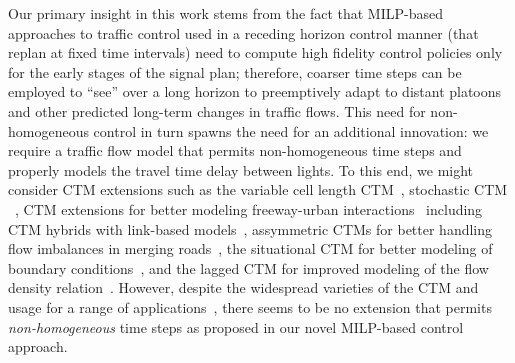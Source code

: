 Our primary insight in this work stems from the fact that MILP-based
approaches to traffic control used in a receding horizon control
manner (that replan at fixed time intervals) need to compute high
fidelity control policies only for the early stages of the signal
plan; therefore, coarser time steps can be employed to ``see'' over a
long horizon to preemptively adapt to distant platoons and other
predicted long-term changes in traffic flows.
This need for non-homogeneous control in
turn spawns the need for an additional innovation: we require a
traffic flow
model that permits non-homogeneous time steps and properly models the
travel time delay between lights.  To this end, we might consider CTM
extensions such as the variable cell length
CTM~, stochastic CTM
~,
CTM extensions for better modeling freeway-urban
interactions~ including CTM hybrids with
link-based models~, assymmetric
CTMs for better handling flow imbalances in merging
roads~, the situational CTM for better
modeling of boundary conditions~, and the
lagged CTM for improved modeling of the flow density
relation~.  However, despite the widespread
varieties of the CTM and usage for a range of
applications~, there seems to be
no extension that permits \emph{non-homogeneous} time steps as proposed in
our novel MILP-based control approach.


